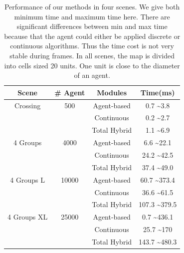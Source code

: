 \documentclass[conference]{acmsiggraph}
\begin{document}
\begin{table}  
\centering  
\begin{tabular}{|c|c|c|c|}
\hline 
Scene & \# Agent & Modules & Time(ms) \\ 
\hline 
Crossing & 500 & Agent-based & 0.7 \textasciitilde 3.8 \\ 
 &  & Continuous & 0.2 \textasciitilde 2.7 \\ 
 &  & Total Hybrid & 1.1 \textasciitilde 6.9 \\ 
\hline 
4 Groups & 4000 & Agent-based & 6.6 \textasciitilde 22.1 \\ 
 &  & Continuous & 24.2 \textasciitilde 42.5 \\ 
 &  & Total Hybrid & 37.4 \textasciitilde 49.0 \\ 
\hline 
4 Groups L & 10000 & Agent-based & 60.7 \textasciitilde 373.4 \\ 
 &  & Continuous & 36.6 \textasciitilde 61.5 \\ 
 &  & Total Hybrid & 107.3 \textasciitilde 379.5 \\ 
\hline 
4 Groups XL & 25000 & Agent-based & 0.7 \textasciitilde 436.1 \\ 
 &  & Continuous & 25.7 \textasciitilde 170 \\  
 &  & Total Hybrid & 143.7 \textasciitilde 480.3 \\ 
\hline 
\end{tabular} 
\caption{Performance of our methods in four scenes. We give both minimum time and maximum time here. There are significant differences between min and max time because that the agent could either be applied discrete or continuous algorithms. Thus the time cost is not very stable during frames. In all scenes, the map is divided into cells sized 20 units. One unit is close to the diameter of an agent.}  
\label{table:2}
\end{table}
\end{document}
